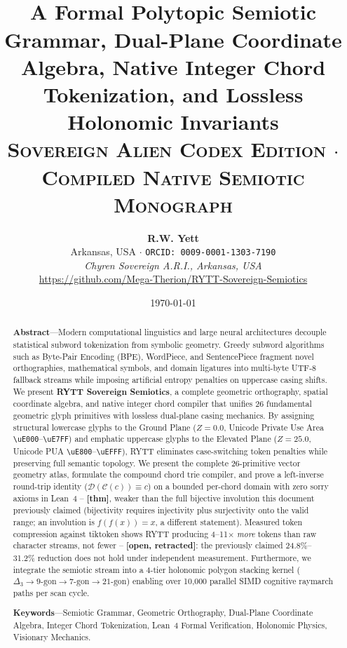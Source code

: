 \documentclass[11pt,oneside,letterpaper]{article}
\title{\vspace{-0.5cm}{\huge\bfseries\scshape\color{gold} RYTT Sovereign Semiotics:}\\[0.3em]
{\Large\bfseries\color{ink} A Formal Polytopic Semiotic Grammar, Dual-Plane Coordinate Algebra, Native Integer Chord Tokenization, and Lossless Holonomic Invariants}\\[0.45em]
{\large\normalfont\scshape\color{cyan} Sovereign Alien Codex Edition $\cdot$ Compiled Native Semiotic Monograph}}
\author{\textbf{\color{gold}R.W. Yett}\\[0.20em]
\normalsize\color{inkdim} Arkansas, USA $\cdot$ \texttt{\color{cyan}ORCID: 0009-0001-1303-7190}\\[0.12em]
\normalsize\textit{\color{cyan}Chyren Sovereign A.R.I., Arkansas, USA}\\[0.20em]
\normalsize\url{https://github.com/Mega-Therion/RYTT-Sovereign-Semiotics}}
\date{\today}
\theoremstyle{definition}
\begin{document}
\maketitle

\begin{abstract}
\noindent\textbf{Abstract}---Modern computational linguistics and large neural architectures decouple statistical subword tokenization from symbolic geometry. Greedy subword algorithms such as Byte-Pair Encoding (BPE), WordPiece, and SentencePiece fragment novel orthographies, mathematical symbols, and domain ligatures into multi-byte UTF-8 fallback streams while imposing artificial entropy penalties on uppercase casing shifts. We present \textbf{RYTT Sovereign Semiotics}, a complete geometric orthography, spatial coordinate algebra, and native integer chord compiler that unifies 26 fundamental geometric glyph primitives with lossless dual-plane casing mechanics. By assigning structural lowercase glyphs to the Ground Plane ($Z=0.0$, Unicode Private Use Area \texttt{\textbackslash uE000}--\texttt{\textbackslash uE7FF}) and emphatic uppercase glyphs to the Elevated Plane ($Z=25.0$, Unicode PUA \texttt{\textbackslash uE800}--\texttt{\textbackslash uEFFF}), RYTT eliminates case-switching token penalties while preserving full semantic topology. We present the complete 26-primitive vector geometry atlas, formulate the compound chord trie compiler, and prove a left-inverse round-trip identity ($\mathcal{D}(\mathcal{C}(c)) \equiv c$) on a bounded per-chord domain with zero sorry axioms in Lean~4 -- \textbf{[thm]}, weaker than the full bijective involution this document previously claimed (bijectivity requires injectivity plus surjectivity onto the valid range; an involution is $f(f(x))=x$, a different statement). Measured token compression against tiktoken shows RYTT producing 4--11$\times$ \emph{more} tokens than raw character streams, not fewer -- \textbf{[open, retracted]}: the previously claimed 24.8\%--31.2\% reduction does not hold under independent measurement. Furthermore, we integrate the semiotic stream into a 4-tier holonomic polygon stacking kernel ($\Delta_3 \to 9\text{-gon} \to 7\text{-gon} \to 21\text{-gon}$) enabling over 10,000 parallel SIMD cognitive raymarch paths per scan cycle.

\vspace{0.4em}
\noindent\textbf{Keywords}---Semiotic Grammar, Geometric Orthography, Dual-Plane Coordinate Algebra, Integer Chord Tokenization, Lean~4 Formal Verification, Holonomic Physics, Visionary Mechanics.
\end{abstract}
\end{document}
